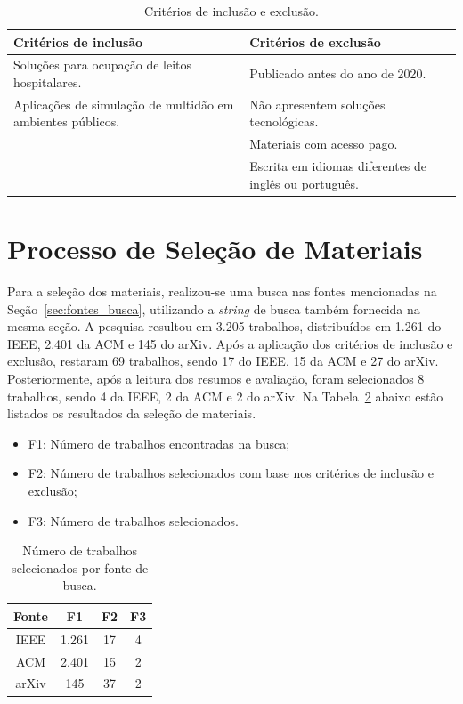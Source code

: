 \begin{table}[h!]
\centering
\begin{tabular}{ |m{15em}|m{15em}| } 
 \hline
 Critérios de inclusão & Critérios de exclusão \\ 
 \hline
 Soluções para ocupação de leitos hospitalares. & Publicado antes do ano de 2020.\\[0.5cm]
 Aplicações de simulação de multidão em ambientes públicos.  & Não apresentem soluções tecnológicas.\\[0.5cm]
& Materiais com acesso pago.\\[0.5cm]
 & Escrita em idiomas diferentes de inglês ou português.\\
 \hline
\end{tabular}
\caption{Critérios de inclusão e exclusão.}
\label{table:1}
\end{table}

\section{\label{sec:processo_selecao}Processo de Seleção de Materiais}
Para a seleção dos materiais, realizou-se uma busca nas fontes mencionadas na Seção~\ref{sec:fontes_busca}, utilizando a \textit{string} de busca também fornecida na mesma seção. A pesquisa resultou em 3.205 trabalhos, distribuídos em 1.261 do IEEE, 2.401 da ACM e 145 do arXiv. Após a aplicação dos critérios de inclusão e exclusão, restaram 69 trabalhos, sendo 17 do IEEE, 15 da ACM e 27 do arXiv. Posteriormente, após a leitura dos resumos e avaliação, foram selecionados 8 trabalhos, sendo 4 da IEEE, 2 da ACM e 2 do arXiv. Na Tabela~\ref{table:2} abaixo estão listados os resultados da seleção de materiais.

\begin{itemize}
    \item F1: Número de trabalhos encontradas na busca; 
    \item F2: Número de trabalhos selecionados com base nos critérios de inclusão e exclusão;
    \item F3: Número de trabalhos selecionados.
\end{itemize}

\begin{table}[h!]
\centering
\begin{tabular}{ |c|c|c|c| } 
 \hline
 Fonte & F1 & F2 & F3 \\ 
 \hline
 IEEE & 1.261 & 17 & 4\\ 
 ACM & 2.401 & 15 & 2\\ 
 arXiv & 145 & 37 & 2\\ 
 \hline
\end{tabular}
\caption{Número de trabalhos selecionados por fonte de busca.}
\label{table:2}
\end{table}

